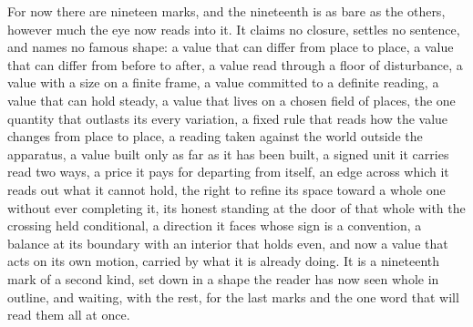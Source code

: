 For now there are nineteen marks, and the nineteenth is as bare as the others, however much the eye now reads into it. It claims no closure, settles no sentence, and names no famous shape: a value that can differ from place to place, a value that can differ from before to after, a value read through a floor of disturbance, a value with a size on a finite frame, a value committed to a definite reading, a value that can hold steady, a value that lives on a chosen field of places, the one quantity that outlasts its every variation, a fixed rule that reads how the value changes from place to place, a reading taken against the world outside the apparatus, a value built only as far as it has been built, a signed unit it carries read two ways, a price it pays for departing from itself, an edge across which it reads out what it cannot hold, the right to refine its space toward a whole one without ever completing it, its honest standing at the door of that whole with the crossing held conditional, a direction it faces whose sign is a convention, a balance at its boundary with an interior that holds even, and now a value that acts on its own motion, carried by what it is already doing. It is a nineteenth mark of a second kind, set down in a shape the reader has now seen whole in outline, and waiting, with the rest, for the last marks and the one word that will read them all at once.
